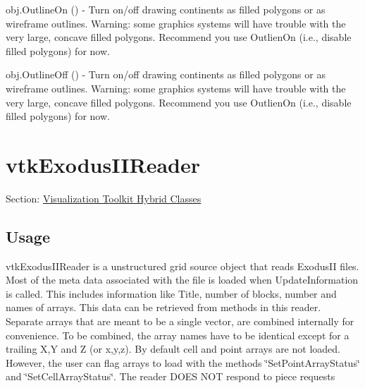 \begin{DoxyItemize}
\item {\ttfamily obj.\-Outline\-On ()} -\/ Turn on/off drawing continents as filled polygons or as wireframe outlines. Warning\-: some graphics systems will have trouble with the very large, concave filled polygons. Recommend you use Outlien\-On (i.\-e., disable filled polygons) for now.  
\item {\ttfamily obj.\-Outline\-Off ()} -\/ Turn on/off drawing continents as filled polygons or as wireframe outlines. Warning\-: some graphics systems will have trouble with the very large, concave filled polygons. Recommend you use Outlien\-On (i.\-e., disable filled polygons) for now.  
\end{DoxyItemize}\hypertarget{vtkhybrid_vtkexodusiireader}{}\section{vtk\-Exodus\-I\-I\-Reader}\label{vtkhybrid_vtkexodusiireader}
Section\-: \hyperlink{sec_vtkhybrid}{Visualization Toolkit Hybrid Classes} \hypertarget{vtkwidgets_vtkxyplotwidget_Usage}{}\subsection{Usage}\label{vtkwidgets_vtkxyplotwidget_Usage}
vtk\-Exodus\-I\-I\-Reader is a unstructured grid source object that reads Exodus\-I\-I files. Most of the meta data associated with the file is loaded when Update\-Information is called. This includes information like Title, number of blocks, number and names of arrays. This data can be retrieved from methods in this reader. Separate arrays that are meant to be a single vector, are combined internally for convenience. To be combined, the array names have to be identical except for a trailing X,Y and Z (or x,y,z). By default cell and point arrays are not loaded. However, the user can flag arrays to load with the methods \char`\"{}\-Set\-Point\-Array\-Status\char`\"{} and \char`\"{}\-Set\-Cell\-Array\-Status\char`\"{}. The reader D\-O\-E\-S N\-O\-T respond to piece requests

